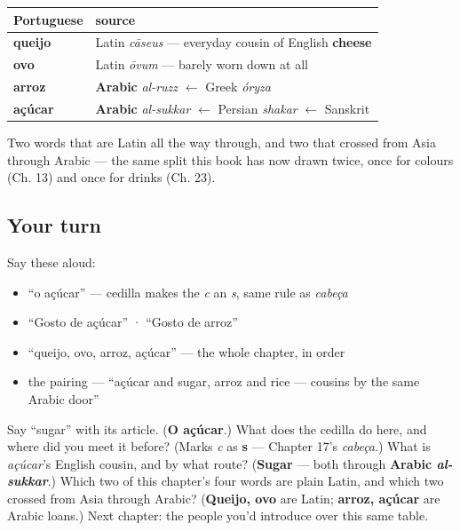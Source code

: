 \begin{grammarlens}[title={What you've built: The chapter in one table}]
\noindent
\begin{tabularx}{\linewidth}{@{}>{\raggedright\arraybackslash}X>{\raggedright\arraybackslash}X@{}}
\toprule
\textbf{Portuguese} & \textbf{source} \\
\midrule
\textbf{queijo} & Latin \emph{cāseus} — everyday cousin of English \textbf{cheese} \\
\textbf{ovo} & Latin \emph{ōvum} — barely worn down at all \\
\textbf{arroz} & \textbf{Arabic} \emph{al-ruzz} $\leftarrow$ Greek \emph{óryza} \\
\textbf{açúcar} & \textbf{Arabic} \emph{al-sukkar} $\leftarrow$ Persian \emph{shakar} $\leftarrow$ Sanskrit \\
\bottomrule
\end{tabularx}

Two words that are Latin all the way through, and two that crossed from Asia through Arabic — the same split this book has now drawn twice, once for colours (Ch. 13) and once for drinks (Ch. 23).
\end{grammarlens}

\subsection*{Your turn}
Say these aloud:

\begin{itemize}
\raggedright
  \item \textquotedblleft{}o açúcar\textquotedblright{} — cedilla makes the \emph{c} an \emph{s}, same rule as \emph{cabeça}
  \item \textquotedblleft{}Gosto de açúcar\textquotedblright{} · \textquotedblleft{}Gosto de arroz\textquotedblright{}
  \item \textquotedblleft{}queijo, ovo, arroz, açúcar\textquotedblright{} — the whole chapter, in order
  \item the pairing — \textquotedblleft{}açúcar and sugar, arroz and rice — cousins by the same Arabic door\textquotedblright{}
\end{itemize}

\begin{tcolorbox}[breakable,colback=teal!4,colframe=teal!35!black,title={Before you move on}]
Say \textquotedblleft{}sugar\textquotedblright{} with its article. (\textbf{O açúcar}.) What does the cedilla do here, and where did you meet it before? (Marks \emph{c} as \textbf{s} — Chapter 17's \emph{cabeça}.) What is \emph{açúcar}'s English cousin, and by what route? (\textbf{Sugar} — both through \textbf{Arabic \emph{al-sukkar}}.) Which two of this chapter's four words are plain Latin, and which two crossed from Asia through Arabic? (\textbf{Queijo, ovo} are Latin; \textbf{arroz, açúcar} are Arabic loans.) Next chapter: the people you'd introduce over this same table.
\end{tcolorbox}
